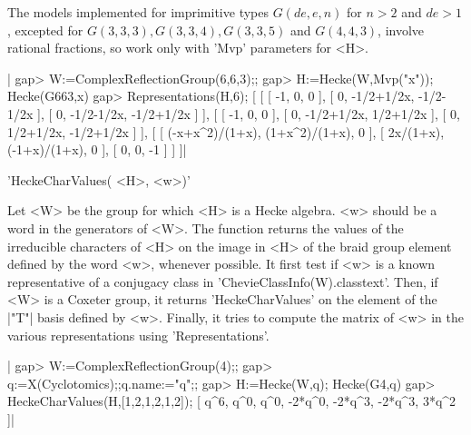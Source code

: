The  models  implemented  for  imprimitive  types $G(de,e,n)$ for $n>2$ and
$de>1$,  excepted  for  $G(3,3,3),  G(3,3,4),  G(3,3,5)$  and  $ G(4,4,3)$,
involve rational fractions, so work only with 'Mvp' parameters for <H>.

|    gap> W:=ComplexReflectionGroup(6,6,3);;
    gap> H:=Hecke(W,Mvp("x"));
    Hecke(G663,x)
    gap> Representations(H,6);
    [ [ [ -1, 0, 0 ], [ 0, -1/2+1/2x, -1/2-1/2x ],
          [ 0, -1/2-1/2x, -1/2+1/2x ] ],
      [ [ -1, 0, 0 ], [ 0, -1/2+1/2x, 1/2+1/2x ],
          [ 0, 1/2+1/2x, -1/2+1/2x ] ],
      [ [ (-x+x^2)/(1+x), (1+x^2)/(1+x), 0 ],
          [ 2x/(1+x), (-1+x)/(1+x), 0 ], [ 0, 0, -1 ] ] ]|


'HeckeCharValues( <H>, <w>)'

Let <W> be the group for which <H> is a Hecke algebra. <w> should be a word
in  the  generators  of  <W>.  The  function  returns  the  values  of  the
irreducible  characters  of  <H>  on  the  image  in <H> of the braid group
element defined by the word <w>, whenever possible. It first test if <w> is
a known representative of a conjugacy class in
'ChevieClassInfo(W).classtext'. Then, if <W> is a Coxeter group, it returns
'HeckeCharValues'  on  the  element  of  the  |"T"|  basis  defined by <w>.
Finally,   it  tries  to   compute  the  matrix   of  <w>  in  the  various
representations using 'Representations'.

|    gap> W:=ComplexReflectionGroup(4);;
    gap> q:=X(Cyclotomics);;q.name:="q";;
    gap> H:=Hecke(W,q);
    Hecke(G4,q)
    gap> HeckeCharValues(H,[1,2,1,2,1,2]);
    [ q^6, q^0, q^0, -2*q^0, -2*q^3, -2*q^3, 3*q^2 ]|

